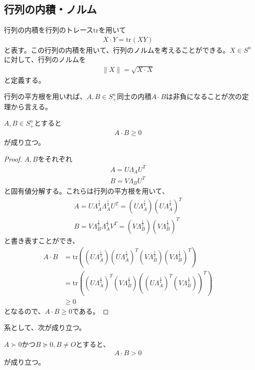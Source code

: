 \subsection{行列の内積・ノルム}
行列の内積を行列のトレース$\mathrm{tr}$を用いて
\begin{align*}
  X \cdot Y = \mathrm{tr}\left(X Y\right)
\end{align*}
と表す。この行列の内積を用いて、行列のノルムを考えることができる。$X \in S^n$に対して、行列のノルムを
\begin{align*}
  \|X\| = \sqrt{X \cdot X}
\end{align*}
と定義する。

行列の平方根を用いれば、$A, B \in S_+^n$同士の内積$A \cdot B$は非負になることが次の定理から言える。
\begin{theorem} \label{SemidefiniteInnerProduct}
  $A, B \in S_+^n$とすると
  \begin{align*}
    A \cdot B \geq 0
  \end{align*}
  が成り立つ。
\end{theorem}
\begin{proof}
  $A, B$をそれぞれ
  \begin{align*}
    A = U \Lambda_A U^T \\
    B = V \Lambda_B U^T
  \end{align*}
  と固有値分解する。これらは行列の平方根を用いて、
  \begin{align*}
    A = U \Lambda_A^\frac{1}{2} \Lambda_A^\frac{1}{2} U^T = \left(U \Lambda_A^\frac{1}{2}\right) \left(U \Lambda_A^\frac{1}{2}\right)^T\\
    B = V \Lambda_B^\frac{1}{2} \Lambda_A^\frac{1}{2} V^T = \left(V \Lambda_B^\frac{1}{2}\right) \left(V \Lambda_B^\frac{1}{2}\right)^T
  \end{align*}
  と書き表すことができ、
  \begin{align*}
    A \cdot B & = \mathrm{tr}\left(\left(U \Lambda_A^\frac{1}{2}\right) \left(U \Lambda_A^\frac{1}{2}\right)^T \left(V \Lambda_B^\frac{1}{2}\right) \left(V \Lambda_B^\frac{1}{2}\right)^T\right) \\
              & = \mathrm{tr}\left(\left(U \Lambda_A^\frac{1}{2}\right)^T \left(V \Lambda_B^\frac{1}{2}\right) \left(\left(U \Lambda_A^\frac{1}{2}\right)^T \left(V \Lambda_B^\frac{1}{2}\right)\right)^T\right) \\
              & \geq 0
  \end{align*}
  となるので、$A \cdot B \geq 0$である。
\end{proof}
系として、次が成り立つ。
\begin{colollary} \label{PsdAndPdInnerProduct}
  $A\succ 0$かつ$B \succeq 0, B \not= O$とすると、
  \begin{align*}
    A \cdot B > 0
  \end{align*}
  が成り立つ。
\end{colollary}

